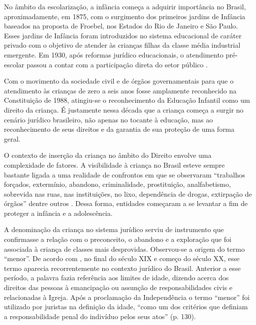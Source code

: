 No âmbito da escolarização, a infância começa a adquirir importância no Brasil, aproximadamente, em 1875, com o surgimento dos primeiros jardins de Infância baseados na proposta de Froebel\footnotemark, nos Estados do Rio de Janeiro e São Paulo. Esses jardins de Infância foram introduzidos no sistema educacional de caráter privado com o objetivo de atender às crianças filhas da classe média industrial emergente. Em 1930, após reformas jurídico educacionais, o atendimento pré-escolar passou a contar com a participação direta do setor público \cite{AHMAD2009}.


Com o movimento da sociedade civil e de órgãos governamentais para que o atendimento às crianças de zero a seis anos fosse amplamente reconhecido na Constituição de 1988, atingiu-se o reconhecimento da Educação Infantil como um direito da criança. É justamente nessa década que a criança começa a surgir no cenário jurídico brasileiro, não apenas no tocante à educação, mas ao reconhecimento de seus direitos e da garantia de sua proteção de uma forma geral. 

O contexto de inserção da criança no âmbito do Direito envolve uma complexidade de fatores. A visibilidade à criança no Brasil esteve sempre bastante ligada a uma realidade de confrontos em que se observaram ``trabalhos forçados, extermínio, abandono, criminalidade, prostituição, analfabetismo, sobrevida nas ruas, nas instituições, no lixo, dependência de drogas, extirpação de órgãos'' dentre outros \cite[p. 40]{SANTOS1994}. Dessa forma, entidades começaram a se levantar a fim de proteger a infância e a adolescência.

A denominação da criança no sistema jurídico serviu de instrumento que confirmasse a relação com o preconceito, o abandono e a exploração que foi associada à criança de classes mais desprovidas. Observou-se a origem do termo ``menor''. De acordo com , no final do século XIX e começo do século XX, esse termo aparecia recorrentemente no contexto jurídico do Brasil. Anterior a esse período, a palavra fazia referência aos limites de idade, dizendo acerca dos direitos das pessoas à emancipação ou assunção de responsabilidades civis e relacionadas à Igreja. Após a proclamação da Independência o termo ``menor'' foi utilizado por juristas na definição da idade, ``como um dos critérios que definiam a responsabilidade penal do indivíduo pelos seus atos'' (p. 130).

